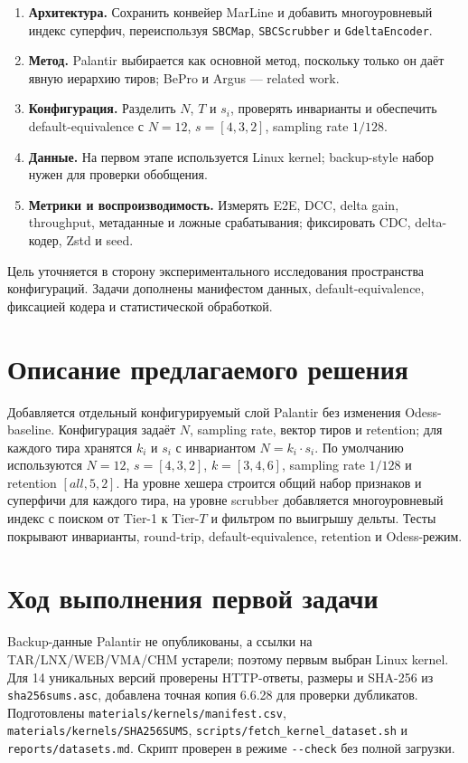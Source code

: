 \documentclass[a4paper]{article}
\begin{document}
\begin{enumerate}
    \item \textbf{Архитектура.} Сохранить конвейер MarLine и добавить многоуровневый индекс суперфич, переиспользуя \texttt{SBCMap}, \texttt{SBCScrubber} и \texttt{GdeltaEncoder}.
    \item \textbf{Метод.} Palantir выбирается как основной метод, поскольку только он даёт явную иерархию тиров; BePro и Argus --- related work.
    \item \textbf{Конфигурация.} Разделить $N$, $T$ и $s_i$, проверять инварианты и обеспечить default-equivalence с $N=12$, $s=[4,3,2]$, sampling rate $1/128$.
    \item \textbf{Данные.} На первом этапе используется Linux kernel; backup-style набор нужен для проверки обобщения.
    \item \textbf{Метрики и воспроизводимость.} Измерять E2E, DCC, delta gain, throughput, метаданные и ложные срабатывания; фиксировать CDC, delta-кодер, Zstd и seed.
\end{enumerate}

Цель уточняется в сторону экспериментального исследования пространства конфигураций. Задачи дополнены манифестом данных, default-equivalence, фиксацией кодера и статистической обработкой.

\section{Описание предлагаемого решения}

Добавляется отдельный конфигурируемый слой Palantir без изменения Odess-baseline. Конфигурация задаёт $N$, sampling rate, вектор тиров и retention; для каждого тира хранятся $k_i$ и $s_i$ с инвариантом $N=k_i \cdot s_i$. По умолчанию используются $N=12$, $s=[4,3,2]$, $k=[3,4,6]$, sampling rate $1/128$ и retention $[all,5,2]$. На уровне хешера строится общий набор признаков и суперфичи для каждого тира, на уровне scrubber добавляется многоуровневый индекс с поиском от Tier-1 к Tier-$T$ и фильтром по выигрышу дельты. Тесты покрывают инварианты, round-trip, default-equivalence, retention и Odess-режим.

\section{Ход выполнения первой задачи}

Backup-данные Palantir не опубликованы, а ссылки на TAR/LNX/WEB/VMA/CHM устарели; поэтому первым выбран Linux kernel. Для 14 уникальных версий проверены HTTP-ответы, размеры и SHA-256 из \texttt{sha256sums.asc}, добавлена точная копия 6.6.28 для проверки дубликатов. Подготовлены \texttt{materials/kernels/manifest.csv}, \texttt{materials/kernels/SHA256SUMS}, \texttt{scripts/fetch\_kernel\_dataset.sh} и \texttt{reports/datasets.md}. Скрипт проверен в режиме \texttt{-{}-check} без полной загрузки.
\end{document}

